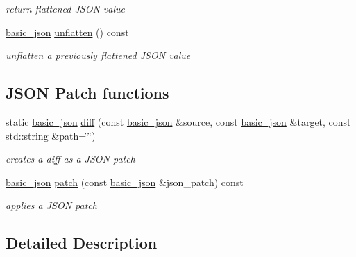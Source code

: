 \begin{DoxyCompactItemize}
\begin{DoxyCompactList}\small\item\em return flattened J\+S\+ON value \end{DoxyCompactList}\item 
\hyperlink{classnlohmann_1_1basic__json}{basic\+\_\+json} \hyperlink{classnlohmann_1_1basic__json_abb58a0ce5996bd3bc17a3dd954217af6}{unflatten} () const 
\begin{DoxyCompactList}\small\item\em unflatten a previously flattened J\+S\+ON value \end{DoxyCompactList}\end{DoxyCompactItemize}
\subsection*{J\+S\+ON Patch functions}
\begin{DoxyCompactItemize}
\item 
static \hyperlink{classnlohmann_1_1basic__json}{basic\+\_\+json} \hyperlink{classnlohmann_1_1basic__json_a543bd5f7490de54c875b2c0912dc9a49}{diff} (const \hyperlink{classnlohmann_1_1basic__json}{basic\+\_\+json} \&source, const \hyperlink{classnlohmann_1_1basic__json}{basic\+\_\+json} \&target, const std\+::string \&path=\char`\"{}\char`\"{})
\begin{DoxyCompactList}\small\item\em creates a diff as a J\+S\+ON patch \end{DoxyCompactList}\item 
\hyperlink{classnlohmann_1_1basic__json}{basic\+\_\+json} \hyperlink{classnlohmann_1_1basic__json_ad87518a27b13f886b836bb93213e6515}{patch} (const \hyperlink{classnlohmann_1_1basic__json}{basic\+\_\+json} \&json\+\_\+patch) const 
\begin{DoxyCompactList}\small\item\em applies a J\+S\+ON patch \end{DoxyCompactList}\end{DoxyCompactItemize}


\subsection{Detailed Description}
